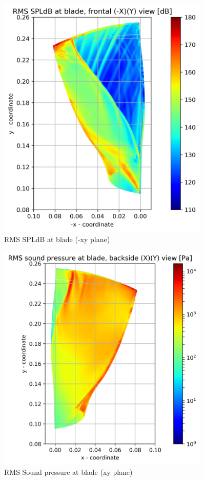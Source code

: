 \begin{figure}[ht]
	\centering
	\includegraphics[width=0.9\textwidth]{Figures/blade-negxy-rms-spldb.png}
	\caption{RMS SPLdB at blade (-xy plane)} \label{blade-negxy-rms-spldb}
\end{figure}

\begin{figure}[ht]
	\centering
	\includegraphics[width=0.9\textwidth]{Figures/blade-xy-rms-spl.png}
   	\caption{RMS Sound pressure at blade (xy plane)} \label{blade-xy-rms-spl}
\end{figure}

